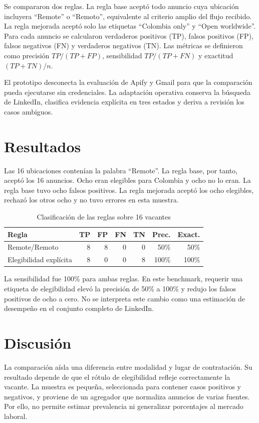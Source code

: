 \documentclass[conference]{IEEEtran}
\begin{document}
Se compararon dos reglas. La regla base aceptó todo anuncio cuya ubicación incluyera ``Remote'' o ``Remoto'', equivalente al criterio amplio del flujo recibido. La regla mejorada aceptó solo las etiquetas ``Colombia only'' y ``Open worldwide''. Para cada anuncio se calcularon verdaderos positivos (TP), falsos positivos (FP), falsos negativos (FN) y verdaderos negativos (TN). Las métricas se definieron como precisión $TP/(TP+FP)$, sensibilidad $TP/(TP+FN)$ y exactitud $(TP+TN)/n$.

El prototipo desconecta la evaluación de Apify y Gmail para que la comparación pueda ejecutarse sin credenciales. La adaptación operativa conserva la búsqueda de LinkedIn, clasifica evidencia explícita en tres estados y deriva a revisión los casos ambiguos.

\section{Resultados}
Las 16 ubicaciones contenían la palabra ``Remote''. La regla base, por tanto, aceptó los 16 anuncios. Ocho eran elegibles para Colombia y ocho no lo eran. La regla base tuvo ocho falsos positivos. La regla mejorada aceptó los ocho elegibles, rechazó los otros ocho y no tuvo errores en esta muestra.

\begin{table}[htbp]
\caption{Clasificación de las reglas sobre 16 vacantes}
\label{tab:resultados}
\centering
\begin{tabular}{lrrrrrr}
\toprule
Regla & TP & FP & FN & TN & Prec. & Exact. \\
\midrule
Remote/Remoto & 8 & 8 & 0 & 0 & 50\% & 50\% \\
Elegibilidad explícita & 8 & 0 & 0 & 8 & 100\% & 100\% \\
\bottomrule
\end{tabular}
\end{table}

La sensibilidad fue 100\% para ambas reglas. En este benchmark, requerir una etiqueta de elegibilidad elevó la precisión de 50\% a 100\% y redujo los falsos positivos de ocho a cero. No se interpreta este cambio como una estimación de desempeño en el conjunto completo de LinkedIn.

\section{Discusión}
La comparación aísla una diferencia entre modalidad y lugar de contratación. Su resultado depende de que el rótulo de elegibilidad refleje correctamente la vacante. La muestra es pequeña, seleccionada para contener casos positivos y negativos, y proviene de un agregador que normaliza anuncios de varias fuentes. Por ello, no permite estimar prevalencia ni generalizar porcentajes al mercado laboral.
\end{document}
